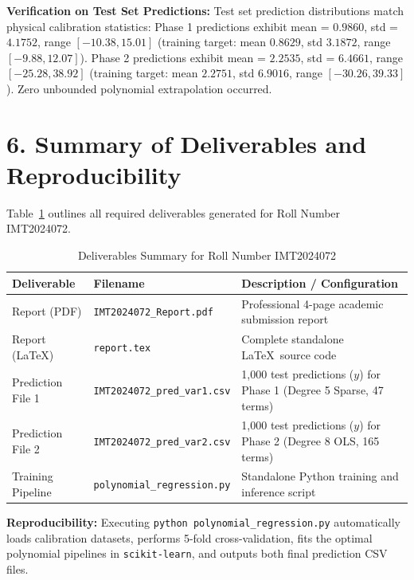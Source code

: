 \documentclass[11pt,a4paper]{article}
\begin{document}
\textbf{Verification on Test Set Predictions:} Test set prediction distributions match physical calibration statistics: Phase 1 predictions exhibit mean = $0.9860$, std = $4.1752$, range $[-10.38, 15.01]$ (training target: mean $0.8629$, std $3.1872$, range $[-9.88, 12.07]$). Phase 2 predictions exhibit mean = $2.2535$, std = $6.4661$, range $[-25.28, 38.92]$ (training target: mean $2.2751$, std $6.9016$, range $[-30.26, 39.33]$). Zero unbounded polynomial extrapolation occurred.

\section{\color{primary} 6. Summary of Deliverables and Reproducibility}

Table~\ref{tab:deliverables} outlines all required deliverables generated for Roll Number IMT2024072.

\begin{table}[h]
\centering
\small
\caption{Deliverables Summary for Roll Number IMT2024072}
\label{tab:deliverables}
\begin{tabular}{lll}
\toprule
\rowcolor{primary} \color{white}\textbf{Deliverable} & \color{white}\textbf{Filename} & \color{white}\textbf{Description / Configuration} \\
\midrule
Report (PDF) & \texttt{IMT2024072\_Report.pdf} & Professional 4-page academic submission report \\
\rowcolor{tablelight} Report (\LaTeX) & \texttt{report.tex} & Complete standalone \LaTeX\ source code \\
Prediction File 1 & \texttt{IMT2024072\_pred\_var1.csv} & 1,000 test predictions ($y$) for Phase 1 (Degree 5 Sparse, 47 terms) \\
\rowcolor{tablelight} Prediction File 2 & \texttt{IMT2024072\_pred\_var2.csv} & 1,000 test predictions ($y$) for Phase 2 (Degree 8 OLS, 165 terms) \\
Training Pipeline & \texttt{polynomial\_regression.py} & Standalone Python training and inference script \\
\bottomrule
\end{tabular}
\end{table}

\textbf{Reproducibility:} Executing \texttt{python polynomial\_regression.py} automatically loads calibration datasets, performs 5-fold cross-validation, fits the optimal polynomial pipelines in \texttt{scikit-learn}, and outputs both final prediction CSV files.
\end{document}
